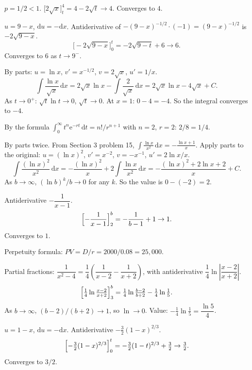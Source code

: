 \begin{solutions}
  \item $p=1/2<1$. $\displaystyle\bigl[2\sqrt{x}\bigr]_{t}^{4}
        =4-2\sqrt{t}\to 4$. Converges to $4$.

  \item $u=9-x$, $\mathrm{d}u=-\mathrm{d}x$. Antiderivative of
        $-(9-x)^{-1/2}\cdot(-1)=(9-x)^{-1/2}$ is $-2\sqrt{9-x}$.
        \[
          \bigl[-2\sqrt{9-x}\bigr]_{0}^{t}=-2\sqrt{9-t}+6\to 6 .
        \]
        Converges to $6$ as $t\to 9^{-}$.

  \item By parts: $u=\ln x$, $v'=x^{-1/2}$, $v=2\sqrt{x}$, $u'=1/x$.
        \[
          \int \frac{\ln x}{\sqrt{x}}\,\mathrm{d}x
            =2\sqrt{x}\ln x-\int \frac{2}{\sqrt{x}}\,\mathrm{d}x
            =2\sqrt{x}\ln x-4\sqrt{x}+C .
        \]
        As $t\to 0^{+}$: $\sqrt{t}\ln t\to 0$, $\sqrt{t}\to 0$. At
        $x=1$: $0-4=-4$. So the integral converges to $-4$.

  \item By the formula
        $\int_{0}^{\infty} t^{n}\mathrm{e}^{-rt}\,\mathrm{d}t=n!/r^{n+1}$
        with $n=2$, $r=2$: $2/8=1/4$.

  \item By parts twice. From Section 3 problem 15,
        $\int \frac{\ln x}{x^{2}}\,\mathrm{d}x=-\frac{\ln x+1}{x}$.
        Apply parts to the original: $u=(\ln x)^{2}$, $v'=x^{-2}$,
        $v=-x^{-1}$, $u'=2\ln x/x$.
        \[
          \int \frac{(\ln x)^{2}}{x^{2}}\,\mathrm{d}x
            =-\frac{(\ln x)^{2}}{x}+2\int \frac{\ln x}{x^{2}}\,\mathrm{d}x
            =-\frac{(\ln x)^{2}+2\ln x+2}{x}+C .
        \]
        As $b\to\infty$, $(\ln b)^{k}/b\to 0$ for any $k$. So the value
        is $0-(-2)=2$.

  \item Antiderivative $-\dfrac{1}{x-1}$.
        \[
          \Bigl[-\frac{1}{x-1}\Bigr]_{2}^{b}=-\frac{1}{b-1}+1\to 1 .
        \]
        Converges to $1$.

  \item Perpetuity formula: $PV=D/r=2000/0.08=25{,}000$.

  \item Partial fractions:
        $\dfrac{1}{x^{2}-4}
        =\dfrac{1}{4}\left(\dfrac{1}{x-2}-\dfrac{1}{x+2}\right)$, with
        antiderivative $\dfrac{1}{4}\ln\left|\dfrac{x-2}{x+2}\right|$.
        \[
          \Bigl[\tfrac{1}{4}\ln\tfrac{x-2}{x+2}\Bigr]_{3}^{b}
            =\tfrac{1}{4}\ln\tfrac{b-2}{b+2}-\tfrac{1}{4}\ln\tfrac{1}{5} .
        \]
        As $b\to\infty$, $(b-2)/(b+2)\to 1$, so $\ln\to 0$. Value:
        $-\tfrac{1}{4}\ln\tfrac{1}{5}=\dfrac{\ln 5}{4}$.

  \item $u=1-x$, $\mathrm{d}u=-\mathrm{d}x$. Antiderivative
        $-\tfrac{3}{2}(1-x)^{2/3}$.
        \[
          \Bigl[-\tfrac{3}{2}(1-x)^{2/3}\Bigr]_{0}^{t}
            =-\tfrac{3}{2}(1-t)^{2/3}+\tfrac{3}{2}\to\tfrac{3}{2} .
        \]
        Converges to $3/2$.
\end{solutions}
